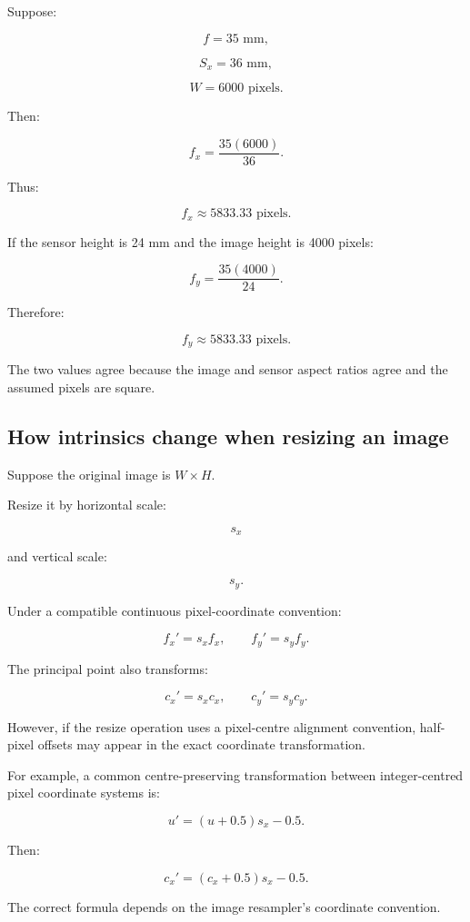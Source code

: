 Suppose:

\[
 f=35\text{ mm},
\]

\[
 S_x=36\text{ mm},
\]

\[
 W=6000\text{ pixels}.
\]

Then:

\[
 f_x=\frac{35(6000)}{36}.
\]

Thus:

\[
 \boxed{ f_x\approx5833.33\text{ pixels} }.
\]

If the sensor height is 24 mm and the image height is 4000 pixels:

\[
 f_y=\frac{35(4000)}{24}.
\]

Therefore:

\[
 \boxed{ f_y\approx5833.33\text{ pixels} }.
\]

The two values agree because the image and sensor aspect ratios agree and the assumed pixels are square.

\subsection{How intrinsics change when resizing an image}\label{02-foundations-ii-ch034-how-intrinsics-change-when-resizing-an-image}

Suppose the original image is \(W\times H\).

Resize it by horizontal scale:

\[
 s_x
\]

and vertical scale:

\[
 s_y.
\]

Under a compatible continuous pixel-coordinate convention:

\[
 \boxed{ f_x'=s_xf_x, \qquad f_y'=s_yf_y }.
\]

The principal point also transforms:

\[
 \boxed{ c_x'=s_xc_x, \qquad c_y'=s_yc_y }.
\]

However, if the resize operation uses a pixel-centre alignment convention, half-pixel offsets may appear in the exact coordinate transformation.

For example, a common centre-preserving transformation between integer-centred pixel coordinate systems is:

\[
 u'=(u+0.5)s_x-0.5.
\]

Then:

\[
 \boxed{ c_x'=(c_x+0.5)s_x-0.5 }.
\]

The correct formula depends on the image resampler's coordinate convention.

